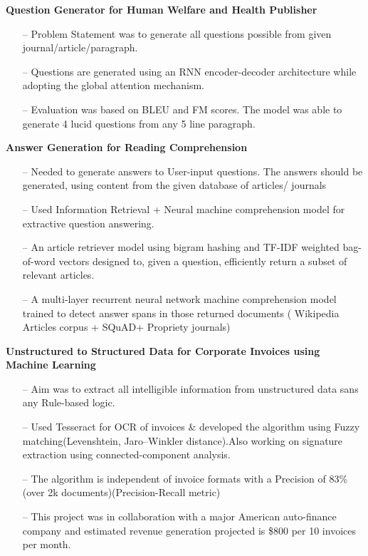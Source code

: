 \documentclass[margin,line]{templates/resume}
\newcommand{\myhref}[3][blue]{\href{#2}{\color{#1}{#3}}}
\newcommand{\compresslist}{%
\setlength{\itemsep}{3pt}%
\setlength{\parskip}{0pt}%
\setlength{\parsep}{0pt}%
}
\begin{document}
\begin{resume}
\vspace{-0.1cm}    
\textsf{\textbf{Question Generator for Human Welfare and Health Publisher}} \hfill{\myhref[darkblue]{https://esha-singh.github.io/\#mpi}{Web}}
\vspace{0.05cm}
\begin{itemize}[leftmargin=*]\compresslist
\item[--]Problem Statement was to generate all questions possible from given journal/article/paragraph.
\item[--]Questions are generated using an RNN encoder-decoder architecture while adopting the global attention mechanism.
\item[--]Evaluation was based on BLEU and FM scores. The model was able to generate 4 lucid questions from any 5 line paragraph.
\end{itemize}

\vspace{-0.1cm}    
\textsf{\textbf{Answer Generation for Reading Comprehension}} \hfill{\myhref[darkblue]{https://esha-singh.github.io/\#mpi}{Web}}
\vspace{0.05cm}
\begin{itemize}[leftmargin=*]\compresslist
\item[--]Needed to generate answers to User-input questions. The answers should be generated, using content from the given database of articles/ journals
\item[--]Used Information Retrieval + Neural  machine comprehension model for extractive question answering.
\item[--]An article retriever model using bigram hashing and TF-IDF weighted bag-of-word vectors designed to, given a question, efficiently return a subset of relevant articles.
\item[--]A multi-layer recurrent neural network machine comprehension model trained to detect answer spans in those returned documents ( Wikipedia Articles corpus + SQuAD+ Propriety journals)
\end{itemize}

\newpage
\vspace{-0.1cm} 
\textsf{\textbf{Unstructured to Structured Data for Corporate Invoices using Machine Learning}}\hfill{\myhref[darkblue]{https://esha-singh.github.io/\#mpi}{Web}}
\vspace{0.05cm}
\begin{itemize}[leftmargin=*]\compresslist
\item[--]Aim was to extract all intelligible information from unstructured data sans any Rule-based logic. 
\item[--]Used Tesseract for OCR of invoices \& developed the algorithm using Fuzzy matching(Levenshtein, Jaro–Winkler distance).Also working on signature extraction using connected-component analysis.
\item[--]The algorithm is independent of invoice formats with a Precision of 83\% (over 2k documents)(Precision-Recall metric)
\item[--]This project was in collaboration with a major American auto-finance company and estimated revenue generation projected is \$800 per 10 invoices per month.


\end{itemize}
\end{resume}
\end{document}
